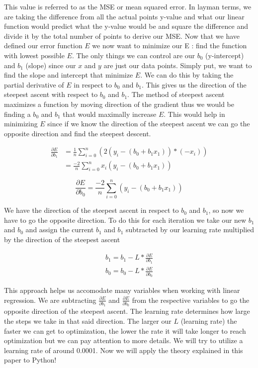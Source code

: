 \documentclass{article}
\begin{document}
\noindent This value is referred to as the MSE or mean squared error. In layman terms, we are taking the difference from all the actual points y-value
and what our linear function would predict what the y-value would be and square the difference and divide it by the total number of points to 
derive our MSE. Now that we have defined our error function $E$ we now want to minimize our E : find the function with lowest possible $E$. The only things
we can control are our $b_0$ (y-intercept) and $b_1$ (slope) since our $x$ and $y$ are just our data points. Simply put, we want to find the slope and intercept that minimize 
$E$. We can do this by taking the partial derivative of $E$ in respect to $b_0$ and $b_1$. This gives us the direction of the steepest ascent with respect to $b_0$
and $b_1$. The method of steepest ascent maximizes a function by moving direction of the gradient thus we would be finding a $b_0$ and $b_1$ that would maximally increase 
$E$. This would help in minimizing $E$ since if we know the direction of the steepest ascent we can go the opposite direction and find the steepest descent.


\begin{equation} 
\begin {split}
\frac{\partial E}{\partial b_1} &= \frac{1}{n} \sum_{i=0}^{n}(2(y_i - (b_0 + b_1x_1)) * (-x_i)) \\
&= \frac{-2}{n}\sum_{i=0}^{n}x_i(y_i - (b_0 + b_1x_1))
\end {split}
\end{equation}

\begin{equation} 
\frac{\partial E}{\partial b_0} = \frac{-2}{n}\sum_{i=0}^{n}(y_i - (b_0 + b_1x_1))
\end{equation}

We have the direction of the steepest ascent in respect to $b_0$ and $b_1$, so now we have to go the opposite direction. 
To do this for each iteration we take our new $b_1$ and $b_0$ and assign the current $b_1$ and $b_1$ subtracted by our learning rate multiplied 
by the direction of the steepest ascent 

\begin{equation} 
\begin{split}
b_1 = b_1 - L * \frac{\partial E}{\partial b_1} \\
b_0 = b_0 - L * \frac{\partial E}{\partial b_0}
\end{split}
\end{equation}

This approach helps us accomodate many variables when working with linear regression. We are subtracting $\frac{\partial E}{\partial b_1}$ 
and $\frac{\partial E}{\partial b_0}$ from the respective variables to go the opposite direction of the steepest ascent. The learning rate
determines how large the steps we take in that said direction. The larger our $L$ (learning rate) the faster we can get to optimization, the 
lower the rate it will take longer to reach optimization but we can pay attention to more details. We will try to utilize a learning rate of around
0.0001. Now we will apply the theory explained in this paper to Python!
\end{document}

